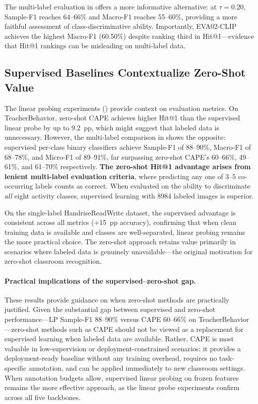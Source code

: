 \documentclass[electronics,article,submit,pdftex,moreauthors]{Definitions/mdpi}
\begin{document}
The multi-label evaluation in  offers a more informative alternative: at $\tau=0.20$, Sample-F1 reaches 64--66\% and Macro-F1 reaches 55--60\%, providing a more faithful assessment of class-discriminative ability. Importantly, EVA02-CLIP achieves the highest Macro-F1 (60.50\%) despite ranking third in Hit@1---evidence that Hit@1 rankings can be misleading on multi-label data.

\subsection{Supervised Baselines Contextualize Zero-Shot Value}
\label{sec:discuss_linear_probe}

The linear probing experiments () provide context on evaluation metrics. On TeacherBehavior, zero-shot CAPE achieves higher Hit@1 than the supervised linear probe by up to 9.2~pp, which might suggest that labeled data is unnecessary. However, the multi-label comparison in  shows the opposite: supervised per-class binary classifiers achieve Sample-F1 of 88--90\%, Macro-F1 of 68--78\%, and Micro-F1 of 89--91\%, far surpassing zero-shot CAPE's 60--66\%, 49--61\%, and 61--70\% respectively. \textbf{The zero-shot Hit@1 advantage arises from lenient multi-label evaluation criteria}, where predicting any one of 3--5 co-occurring labels counts as correct. When evaluated on the ability to discriminate \emph{all} eight activity classes, supervised learning with 8984 labeled images is superior.

On the single-label HandriseReadWrite dataset, the supervised advantage is consistent across all metrics (+15~pp accuracy), confirming that when clean training data is available and classes are well-separated, linear probing remains the more practical choice. The zero-shot approach retains value primarily in scenarios where labeled data is genuinely unavailable---the original motivation for zero-shot classroom recognition.

\paragraph{Practical implications of the supervised--zero-shot gap.}
These results provide guidance on when zero-shot methods are practically justified. Given the substantial gap between supervised and zero-shot performance---LP Sample-F1 88--90\% versus CAPE 60--66\% on TeacherBehavior---zero-shot methods such as CAPE should not be viewed as a replacement for supervised learning when labeled data are available. Rather, CAPE is most valuable in low-supervision or deployment-constrained scenarios: it provides a deployment-ready baseline without any training overhead, requires no task-specific annotation, and can be applied immediately to new classroom settings. When annotation budgets allow, supervised linear probing on frozen features remains the more effective approach, as the linear probe experiments confirm across all five backbones.
\end{document}

